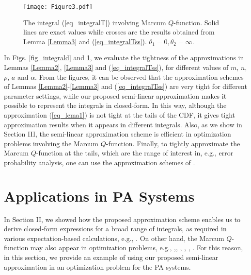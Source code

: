 \begin{figure}
\centering
  \texttt{[image: Figure3.pdf]}\\
\caption{The integral (\ref{eq_integralT}) involving Marcum $Q$-function. Solid lines are exact values while crosses are the results obtained from Lemma \ref{Lemma3} and (\ref{eq_integralTss}). $\theta_1 = 0, \theta_2 = \infty$. }\label{fig_t2}
\end{figure}



In Figs. \ref{fig_integrald} and \ref{fig_t2}, we evaluate the tightness of the approximations in Lemmas \ref{Lemma2}, \ref{Lemma3} and (\ref{eq_integralTss}), for different values of $m$, $n$, $\rho$, $a$ and $\alpha$. From the figures, it can be observed that the approximation schemes of   Lemmas \ref{Lemma2}-\ref{Lemma3} and (\ref{eq_integralTss}) are very tight for different parameter settings, while our proposed semi-linear approximation makes it possible to represent the integrals in closed-form.  In this way, although the approximation (\ref{eq_lema1}) is not tight at the tails of the CDF, it gives tight approximation results when it appears in different integrals. Also, as we show in Section III, the semi-linear approximation scheme is efficient in optimization problems involving the Marcum $Q$-function. Finally, to tightly approximate the Marcum $Q$-function at the tails, which are the range of interest in, e.g., error probability analysis, one can use the approximation schemes of \cite{Simon2000TCexponential,annamalai2001WCMCcauchy}.






\section{Applications in PA Systems}
In Section II, we showed how the proposed approximation scheme enables us to derive closed-form expressions for a broad range of integrals, as required in various expectation-based calculations, e.g., \cite{Simon2003TWCsome,Cao2016CLsolutions,sofotasios2015solutions,Cui2012ELtwo,Gaur2003TVTsome,Simon2000TCexponential,6911973}. On other hand, the Marcum $Q$-function may also  appear in  optimization problems, e.g., \cite[eq. (8)]{Azari2018TCultra},\cite[eq. (9)]{Alam2014INFOCOMWrobust}, \cite[eq. (10)]{Gao2018IAadmm}, \cite[eq. (10)]{Shen2018TVToutage}, \cite[eq. (15)]{Song2017JLTimpact}, \cite[eq. (22)]{Tang2019IAan}.  For this reason, in this section, we provide an example of using our proposed semi-linear approximation in an optimization problem for the PA systems.

